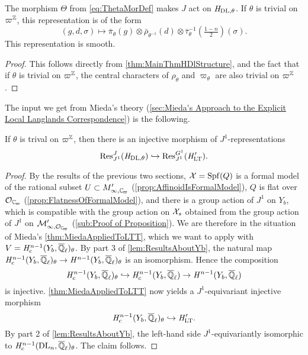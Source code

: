 \documentclass[../main.tex]{subfiles}
\begin{document}
\begin{lem}
  The morphism $\Theta$ from \eqref{eq:ThetaMorDef} makes $J$ act on
  ${\mathit H}_{\mathrm{DL},\theta}$. If $\theta$ is trivial on $\varpi^{\mathbb{Z}}$, this
  representation is of the form 
  \begin{equation*}
    (g,d,\sigma) \mapsto \bar \pi_\theta(g) \otimes \bar \rho_{\theta^{-1}}(d)
    \otimes \bar \tau_\theta^{-1}(\tfrac{1-n}2)(\sigma).
  \end{equation*}
  This representation is smooth.
\begin{proof}
  This follows directly from \cref{thm:MainThmHDlStructure}, and the fact that 
  if $\theta$ is trivial on $\varpi^{\mathbb{Z}}$, the central characters of $\rho_\theta$
  and $\varpi_\theta$ are also trivial on $\varpi^{\mathbb{Z}}$. 
\end{proof}
\end{lem}

The input we get from Mieda's theory (\cref{sec:Mieda's Approach
to the Explicit Local Langlands Correspondence}) is the
following.
\begin{prop}\label{prop:J1EquivInjMor}
  If $\theta$ is trival on $\varpi^{\mathbb{Z}}$, then there is an injective morphism of
  $J^1$-representations
  \begin{equation*} 
    \operatorname{Res}_{J^1}^J( \mathit H_{\mathrm{DL},\theta} ) \hookrightarrow \operatorname{Res}_{J^1}^{G^1}( \mathit H'_{\mathrm{LT}}).
  \end{equation*}
  \begin{proof}
    By the results of the previous two sections, $\mathcal{X} = \operatorname{Spf}(Q)$ is a formal
    model of the rational subset $U \subset M'_{\infty, \Cp}$
    (\cref{prop:AffinoidIsFormalModel}), 
    $Q$ is flat over $\cO_\Cp$ (\cref{prop:FlatnessOfFormalModel}),
    and there is a group action of $J^1$ on $Y_b$, which is compatible with the group
    action on $\mathcal{X}_s$ obtained from the group action of $J^1$ on $\cM_{\infty,
    \cO_\Cp}'$ (\cref{sub:Proof of Proposition}).
    We are therefore in the situation of Mieda's \cref{thm:MiedaAppliedToLTT}, which we want to apply with $V = \mathit H^{n-1}_c(Y_b, {\overline {\mathbb{Q}}_\ell})_\theta$. 
    By part 3 of \cref{lem:ResultsAboutYb}, 
    the natural map $\mathit H_c^{n-1}(Y_b, {\overline {\mathbb{Q}}_\ell})_\theta \to \mathit H^{n-1}(Y_b,
    {\overline {\mathbb{Q}}_\ell})_\theta$ is an isomorphism. Hence the composition
    \begin{equation*}
      \mathit H^{n-1}_c(Y_b, {\overline {\mathbb{Q}}_\ell})_\theta \hookrightarrow \mathit H^{n-1}_c(Y_b, {\overline {\mathbb{Q}}_\ell})
      \to \mathit H^{n-1}(Y_b, {\overline {\mathbb{Q}}_\ell})
    \end{equation*}
    is injective. 
    \cref{thm:MiedaAppliedToLTT} now yields a $J^1$-equivariant injective morphism
    \begin{equation*}
      \mathit H_c^{n-1}(Y_b, {\overline {\mathbb{Q}}_\ell})_\theta \hookrightarrow \mathit H'_{\mathrm{LT}}.
    \end{equation*}
    By part 2 of \cref{lem:ResultsAboutYb}, the left-hand side $J^1$-equivariantly isomorphic to $\mathit H_c^{n-1}(\mathrm{DL}_n, {\overline {\mathbb{Q}}_\ell})_\theta$. The
    claim follows.
  \end{proof}
\end{prop}
\end{document}
